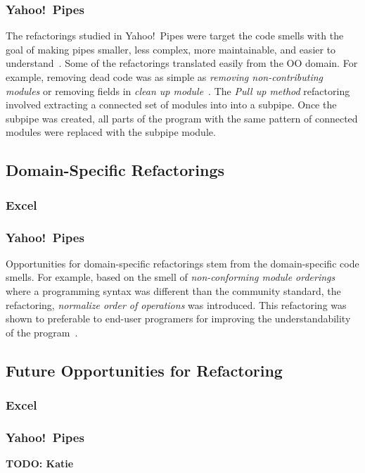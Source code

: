 \documentclass[10pt,conference,compsocconf]{IEEEtran}
\newcommand{\todo}[1]{\textbf{TODO: #1}}
\begin{document}
\subsubsection{Yahoo!\ Pipes}
The refactorings studied in Yahoo!\ Pipes were target the code smells with the goal of making pipes smaller, less complex, more maintainable, and easier to understand~\cite{StoleeTSE2013}. Some of the refactorings translated easily from the OO domain. For example, removing dead code was as simple as \emph{removing non-contributing modules} or removing fields in \emph{clean up module}~\cite{StoleeTSE2013}. The \emph{Pull up method} refactoring involved extracting a connected set of modules into into a subpipe. Once the subpipe was created, all  parts of the program with the same pattern of connected modules were replaced with the subpipe module. 


\subsection{Domain-Specific Refactorings}

\subsubsection{Excel}

\subsubsection{Yahoo!\ Pipes}
Opportunities for domain-specific refactorings stem from the domain-specific code smells. 
For example, based on the smell of \emph{non-conforming module orderings} where a programming syntax was different than the community standard, the refactoring, \emph{normalize order of operations} was introduced. This refactoring was shown to preferable to end-user programers for improving the understandability of the program~\cite{StoleeTSE2013}. 

\subsection{Future Opportunities for Refactoring}
\subsubsection{Excel}
\subsubsection{Yahoo!\ Pipes}
\todo{Katie}
\end{document}
